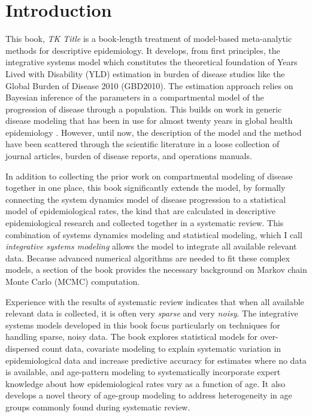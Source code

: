 \section{Introduction}
This book, \emph{TK Title} is a book-length treatment of model-based
meta-analytic methods for descriptive epidemiology.  It develops, from
first principles, the integrative systems model which constitutes the
theoretical foundation of Years Lived with Disability (YLD) estimation
in burden of disease studies like the Global Burden of Disease 2010
(GBD2010).  The estimation approach relies on Bayesian inference of
the parameters in a compartmental model of the progression of disease
through a population.  This builds on work in generic disease modeling
that has been in use for almost twenty years in global health
epidemiology \cite{Barendregt_Generic_2003}.  However, until now, the
description of the model and the method have been scattered through
the scientific literature in a loose collection of journal articles,
burden of disease reports, and operations manuals.

In addition to collecting the prior work on compartmental modeling of
disease together in one place, this book significantly extends the
model, by formally connecting the system dynamics model of disease
progression to a statistical model of epidemiological rates, the kind
that are calculated in descriptive epidemiological research and
collected together in a systematic review.  This combination of systems
dynamics modeling and statistical modeling, which I call
\emph{integrative systems modeling} allows the model to integrate all
available relevant data.  Because advanced numerical algorithms are
needed to fit these complex models, a section of the book provides the
necessary background on Markov chain Monte Carlo (MCMC) computation.

Experience with the results of systematic review indicates that when
all available relevant data is collected, it is often very
\emph{sparse} and very \emph{noisy}.  The integrative systems models
developed in this book focus particularly on techniques for handling
sparse, noisy data.  The book explores statistical models for
over-dispersed count data, covariate modeling to explain
systematic variation in epidemiological data and increase
predictive accuracy for estimates where no data is
available, and age-pattern modeling to systematically incorporate
expert knowledge about how epidemiological rates vary as a function of
age.  It also develops a novel theory of age-group modeling to address
heterogeneity in age groups commonly found during systematic review.

